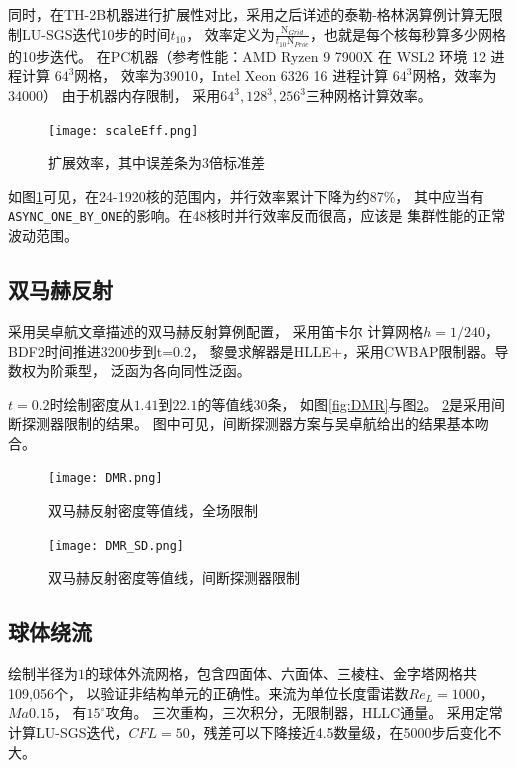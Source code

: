 \documentclass[UTF8,zihao=5]{ctexart} %
\begin{document}
同时，在TH-2B机器进行扩展性对比，采用之后详述的泰勒-格林涡算例计算无限制LU-SGS迭代10步的时间$t_{10}$，
效率定义为$\frac{\text{N}_{Grid}}{t_{10}\text{N}_{Proc}}$，也就是每个核每秒算多少网格的10步迭代。
在PC机器（参考性能：AMD Ryzen 9 7900X 在 WSL2 环境 12 进程计算 $64^3$网格，
效率为39010，Intel Xeon 6326 16 进程计算 $64^3$网格，效率为34000） 
由于机器内存限制，
采用$64^3,128^3,256^3$三种网格计算效率。

\begin{figure}[htbp]
    \centering
    \texttt{[image: scaleEff.png]}  %
    \caption{扩展效率，其中误差条为3倍标准差}
    \label{fig:scaleEff}
\end{figure}

如图\ref{fig:scaleEff}可见，在24-1920核的范围内，并行效率累计下降为约87\%，
其中应当有\verb|ASYNC_ONE_BY_ONE|的影响。在48核时并行效率反而很高，应该是
集群性能的正常波动范围。


\subsection{双马赫反射}

采用吴卓航文章描述的双马赫反射算例配置，
采用笛卡尔
计算网格$h=1/240$，BDF2时间推进3200步到t=0.2，
黎曼求解器是HLLE+，采用CWBAP限制器。导数权为阶乘型，
泛函为各向同性泛函。

$t=0.2$时绘制密度从$1.41$到$22.1$的等值线30条，
如图\ref{fig:DMR}与图\ref{fig:DMR_SD}。
\ref{fig:DMR_SD}是采用间断探测器限制的结果。
图中可见，间断探测器方案与吴卓航给出的结果基本吻合。

\begin{figure}[H]
    \begin{minipage}[c]{0.45\linewidth}  %
        \centering
        \texttt{[image: DMR.png]}
        \caption{双马赫反射密度等值线，全场限制}
        \label{fig:DMR}
    \end{minipage}
    \hfill %
    \begin{minipage}[c]{0.45\linewidth}  %
        \centering
        \texttt{[image: DMR\_SD.png]}
        \caption{双马赫反射密度等值线，间断探测器限制}
        \label{fig:DMR_SD}
    \end{minipage}
\end{figure}

\subsection{球体绕流}

绘制半径为$1$的球体外流网格，包含四面体、六面体、三棱柱、金字塔网格共109,056个，
以验证非结构单元的正确性。来流为单位长度雷诺数$Re_L=1000$，$Ma0.15$，
有$15^\circ$攻角。
三次重构，三次积分，无限制器，HLLC通量。
采用定常计算LU-SGS迭代，$CFL=50$，残差可以下降接近4.5数量级，在5000步后变化不大。
\end{document}
